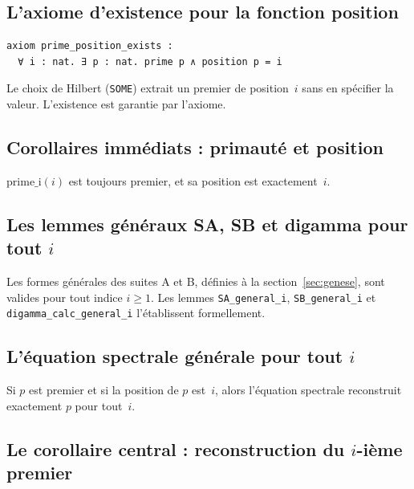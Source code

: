 \documentclass[]{pasj02}
\begin{document}
\subsection{L'axiome d'existence pour la fonction position}
\label{ssec:axiome}
\label{hol:prime_position_exists}

\begin{verbatim}
axiom prime_position_exists :
  ∀ i : nat. ∃ p : nat. prime p ∧ position p = i
\end{verbatim}

Le choix de Hilbert (\texttt{SOME}) extrait un premier de position~$i$ sans
en spécifier la valeur.  L'existence est garantie par l'axiome.

\subsection{Corollaires immédiats : primauté et position}
\label{ssec:corollaires}
\label{hol:primaute_position}

\begin{corollary}
  $\mathrm{prime\_i}(i)$ est toujours premier, et sa position est
  exactement~$i$.
\end{corollary}

\subsection{Les lemmes généraux SA, SB et digamma pour tout $i$}
\label{ssec:lemmes_generaux}
\label{hol:lemmes_i_general}

Les formes générales des suites A et B, définies à la
section~\ref{sec:genese}, sont valides pour tout indice $i \geq 1$.  Les
lemmes \texttt{SA\_general\_i}, \texttt{SB\_general\_i} et
\texttt{digamma\_calc\_general\_i} l'établissent formellement.

\subsection{L'équation spectrale générale pour tout $i$}
\label{ssec:equation_generale}
\label{hol:equation_spectrale_i}

\begin{lemma}
  Si $p$ est premier et si la position de $p$ est~$i$, alors l'équation
  spectrale reconstruit exactement $p$ pour tout~$i$.
\end{lemma}

\subsection{Le corollaire central : reconstruction du $i$-ième premier}
\label{ssec:corollaire_central}
\label{hol:prime_equation_prime_i}
\end{document}
